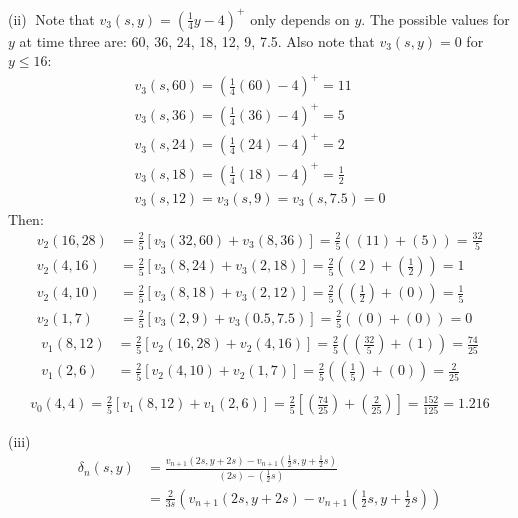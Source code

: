 \documentclass[12pt, letterpaper]{article}
\begin{document}
\rightline{$\square$}

\vspace{5mm}
\noindent
(ii)$\;$ Note that $v_3(s,y) = \left( \tfrac{1}{4}y-4 \right)^+$ only depends on $y$. The possible values for $y$ at time three are: 60, 36, 24, 18, 12, 9, 7.5. Also note that $v_3(s,y) = 0$ for $y \leq 16$:
\begin{gather*}
    v_3(s, 60) = \left(\tfrac{1}{4}(60)-4 \right)^+ = 11 \\
    v_3(s, 36) = \left(\tfrac{1}{4}(36)-4 \right)^+ = 5 \\
    v_3(s, 24) = \left(\tfrac{1}{4}(24)-4 \right)^+ = 2 \\
    v_3(s, 18) = \left(\tfrac{1}{4}(18)-4 \right)^+ = \tfrac{1}{2} \\
    v_3(s, 12) = v_3(s, 9) = v_3(s, 7.5) = 0
\end{gather*}
Then:
\begin{align*}
    v_2(16,28) &= \tfrac{2}{5}\left[v_{3}(32, 60) + v_{3}\left(8, 36\right)\right] = \tfrac{2}{5}((11)+(5)) = \tfrac{32}{5} \\
    v_2(4,16) &= \tfrac{2}{5}\left[v_{3}(8, 24) + v_{3}\left(2, 18\right)\right] = \tfrac{2}{5}\left((2)+\left(\tfrac{1}{2}\right)\right) = 1 \\
    v_2(4,10) &= \tfrac{2}{5}\left[v_{3}(8, 18) + v_{3}\left(2, 12\right)\right] = \tfrac{2}{5}\left(\left(\tfrac{1}{2}\right) + (0)\right) = \tfrac{1}{5} \\
    v_2(1,7) &= \tfrac{2}{5}\left[v_{3}(2, 9) + v_{3}\left(0.5, 7.5\right)\right] = \tfrac{2}{5}\left((0)+(0)\right) = 0
\end{align*}
\begin{align*}
    v_1(8, 12) &= \tfrac{2}{5}\left[v_{2}(16, 28) + v_{2}\left(4, 16\right)\right] = \tfrac{2}{5}\left(\left(\tfrac{32}{5}\right) + (1)\right) = \tfrac{74}{25} \\
    v_1(2, 6) &= \tfrac{2}{5}\left[v_{2}(4, 10) + v_{2}\left(1, 7\right)\right] = \tfrac{2}{5}\left(\left(\tfrac{1}{5}\right) + (0)\right) = \tfrac{2}{25} \\
\end{align*}
\begin{gather*}
    v_0(4,4) = \tfrac{2}{5}\left[ v_1(8,12) + v_1(2,6) \right] = \tfrac{2}{5}\left[ \left(\tfrac{74}{25}\right) + \left(\tfrac{2}{25}\right) \right] = \tfrac{152}{125} = 1.216
\end{gather*}

\rightline{$\square$}

\vspace{5mm}
\noindent
(iii)$\;$
\begin{align*}
    \delta_n(s,y) &= \frac{v_{n+1}(2s, y+2s) - v_{n+1}\left(\tfrac{1}{2}s, y+\tfrac{1}{2}s\right)}{(2s) - \left(\tfrac{1}{2}s\right)} \\ &= \frac{2}{3s}\left( v_{n+1}(2s, y+2s) - v_{n+1}\left(\tfrac{1}{2}s, y+\tfrac{1}{2}s\right) \right)
\end{align*}

\rightline{$\square$}
\end{document}
